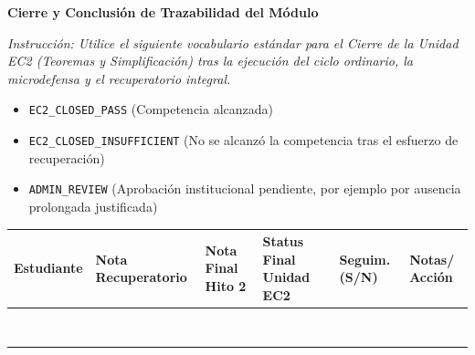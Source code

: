 \documentclass[11pt, a4paper]{article}
\begin{document}
\begin{tcolorbox}[colback=ucbblue!5!white, colframe=ucbblue, title=\textbf{Status Administrativo Final de Competencias - Unidad EC2}]
    \centering \textbf{Cierre y Conclusión de Trazabilidad del Módulo}
\end{tcolorbox}

\noindent \textit{Instrucción: Utilice el siguiente vocabulario estándar para el Cierre de la Unidad EC2 (Teoremas y Simplificación) tras la ejecución del ciclo ordinario, la microdefensa y el recuperatorio integral.}
\begin{itemize}\setlength\itemsep{0.1em}
    \item \texttt{EC2\_CLOSED\_PASS} (Competencia alcanzada)
    \item \texttt{EC2\_CLOSED\_INSUFFICIENT} (No se alcanzó la competencia tras el esfuerzo de recuperación)
    \item \texttt{ADMIN\_REVIEW} (Aprobación institucional pendiente, por ejemplo por ausencia prolongada justificada)
\end{itemize}

\vspace{0.4cm}
\renewcommand{\arraystretch}{1.5}
\noindent
\begin{tabularx}{\textwidth}{>{\RaggedRight\arraybackslash}X >{\centering\arraybackslash}p{2cm} >{\centering\arraybackslash}p{2.5cm} >{\centering\arraybackslash}p{4cm} >{\centering\arraybackslash}p{1.5cm} >{\RaggedRight\arraybackslash}p{2.5cm}}
\toprule
\textbf{Estudiante} & \textbf{Nota \newline Recuperatorio} & \textbf{Nota Final \newline Hito 2} & \textbf{Status Final \newline Unidad EC2} & \textbf{Seguim. (S/N)} & \textbf{Notas/ Acción} \\ 
\midrule
 & & & & & \\ \addlinespace
 & & & & & \\ \addlinespace
 & & & & & \\ \addlinespace
 & & & & & \\ \addlinespace
 & & & & & \\ \addlinespace
 & & & & & \\ \addlinespace
 & & & & & \\ \addlinespace
 & & & & & \\ 
\bottomrule
\end{tabularx}
\end{document}
